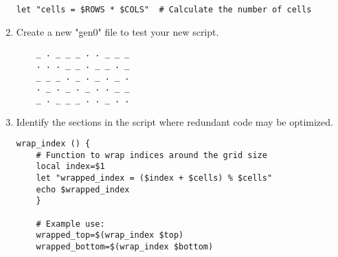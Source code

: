 \documentclass[a4paper, 12pt]{article}
\begin{document}
\begin{enumerate}
\begin{lstlisting}
let "cells = $ROWS * $COLS"  # Calculate the number of cells
    \end{lstlisting}
    \item Create a new "gen0" file to test your new script.
    \begin{lstlisting}
    _ . _ _ _ . . _ _ _
    . . . _ _ . _ _ . _
    _ _ _ . _ . _ . _ .
    . _ . _ . _ . . _ _
    _ . _ _ _ . . _ . .
    \end{lstlisting}
    \item Identify the sections in the script where redundant code may be optimized.
    \begin{lstlisting}
wrap_index () {
    # Function to wrap indices around the grid size
    local index=$1
    let "wrapped_index = ($index + $cells) % $cells"
    echo $wrapped_index
    }

    # Example use:
    wrapped_top=$(wrap_index $top)
    wrapped_bottom=$(wrap_index $bottom)
    \end{lstlisting}
\end{enumerate}
\end{document}
